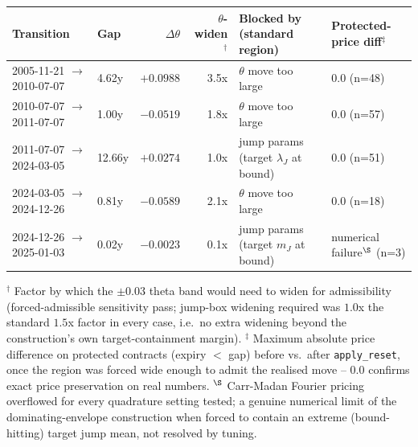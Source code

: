 \begin{tabular}{llrrll}
\toprule
Transition & Gap & $\Delta\theta$ & $\theta$-widen$^\dagger$ & Blocked by (standard region) & Protected-price diff$^\ddagger$ \\
\midrule
2005-11-21 $\to$ 2010-07-07 & 4.62y & $+0.0988$ & 3.5x & $\theta$ move too large & $0.0$ (n=48) \\
2010-07-07 $\to$ 2011-07-07 & 1.00y & $-0.0519$ & 1.8x & $\theta$ move too large & $0.0$ (n=57) \\
2011-07-07 $\to$ 2024-03-05 & 12.66y & $+0.0274$ & 1.0x & jump params (target $\lambda_J$ at bound) & $0.0$ (n=51) \\
2024-03-05 $\to$ 2024-12-26 & 0.81y & $-0.0589$ & 2.1x & $\theta$ move too large & $0.0$ (n=18) \\
2024-12-26 $\to$ 2025-01-03 & 0.02y & $-0.0023$ & 0.1x & jump params (target $m_J$ at bound) & numerical failure$^\S$ (n=3) \\
\bottomrule
\end{tabular}

\vspace{2mm}
\footnotesize
$^\dagger$ Factor by which the $\pm0.03$ theta band would need to widen for admissibility (forced-admissible sensitivity pass; jump-box widening required was $1.0$x the standard $1.5$x factor in every case, i.e.\ no extra widening beyond the construction's own target-containment margin). $^\ddagger$ Maximum absolute price difference on protected contracts (expiry $<$ gap) before vs.\ after \texttt{apply\_reset}, once the region was forced wide enough to admit the realised move -- $0.0$ confirms exact price preservation on real numbers. $^\S$ Carr-Madan Fourier pricing overflowed for every quadrature setting tested; a genuine numerical limit of the dominating-envelope construction when forced to contain an extreme (bound-hitting) target jump mean, not resolved by tuning.
